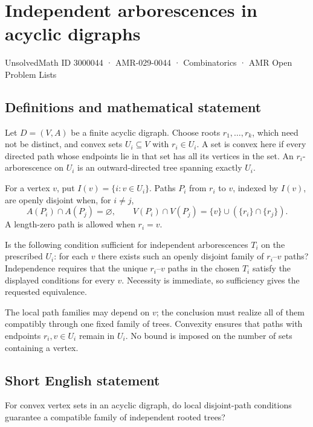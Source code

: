 \documentclass[11pt,a4paper]{article}
\begin{document}
\section*{Independent arborescences in acyclic digraphs}\label{3000044}
{\small UnsolvedMath ID 3000044 · AMR-029-0044 · Combinatorics · AMR Open Problem Lists}
\subsection{Definitions and mathematical statement}
Let $D=(V,A)$ be a finite acyclic digraph. Choose roots
$r_1,\ldots,r_k$, which need not be distinct, and convex sets $U_i\subseteq V$
with $r_i\in U_i$. A set is convex here if every directed path whose
endpoints lie in that set has all its vertices in the set.
An $r_i$-arborescence on $U_i$ is an outward-directed tree spanning
exactly $U_i$.

For a vertex $v$, put $I(v)=\{i:v\in U_i\}$. Paths $P_i$ from $r_i$
to $v$, indexed by $I(v)$, are openly disjoint when, for $i\ne j$,
\[
 A(P_i)\cap A(P_j)=\varnothing,\qquad
 V(P_i)\cap V(P_j)=\{v\}\cup(\{r_i\}\cap\{r_j\}).
\]
A length-zero path is allowed when $r_i=v$.

Is the following condition sufficient for independent arborescences
$T_i$ on the prescribed $U_i$: for each $v$ there exists such an
openly disjoint family of $r_i$--$v$ paths? Independence requires that
the unique $r_i$--$v$ paths in the chosen $T_i$ satisfy the displayed
conditions for every $v$. Necessity is immediate, so sufficiency gives
the requested equivalence.

The local path families may depend on $v$; the conclusion must realize
all of them compatibly through one fixed family of trees. Convexity
ensures that paths with endpoints $r_i,v\in U_i$ remain in $U_i$.
No bound is imposed on the number of sets containing a vertex.
\subsection{Short English statement}
For convex vertex sets in an acyclic digraph, do local disjoint-path
conditions guarantee a compatible family of independent rooted trees?
\end{document}
